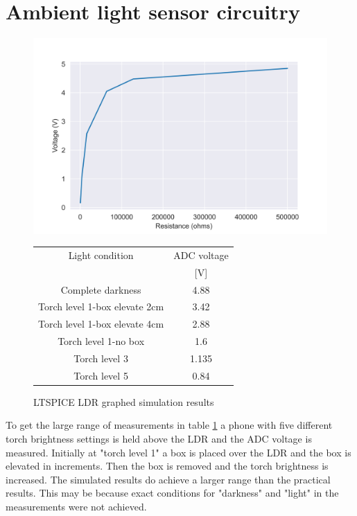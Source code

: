 \newpage
\section{Ambient light sensor circuitry}

\begin{figure}[!htb]
	\begin{minipage}[b]{0.47\textwidth}
		\centering
		\includegraphics[width=1\textwidth]{./Figures/A7/A7ldr.png}
		\caption{LTSPICE LDR graphed simulation results}
		\label{fig:by:table}
	\end{minipage}%
	\hfill%
	\begin{minipage}[b]{0.47\textwidth}
		\centering
		\begin{tabular}{|c|c|} \hline
			Light condition&ADC voltage \\
		&  [V] \\ \hline\hline
			Complete darkness&4.88   \\
			Torch level 1-box elevate 2cm&3.42 \\
			Torch level 1-box elevate 4cm&2.88 \\
			Torch level 1-no box&1.6 \\
			Torch level 3	&1.135 	\\
			Torch level 5	&0.84 	\\  \hline
		\end{tabular}
		\label{tab:LDR}
	\end{minipage}%
\end{figure}

To get the large range of measurements in table \ref{tab:LDR} a phone with five different torch brightness settings is held above the LDR and the ADC voltage is measured. Initially at "torch level 1" a box is placed over the LDR and the box is elevated in increments.  Then the box is removed and the torch brightness is increased. The simulated results do achieve a larger range than the practical results. This may be because exact conditions for "darkness" and "light" in the measurements were not achieved.
 

